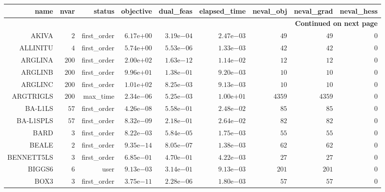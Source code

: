 \begin{longtable}{rrrrrrrrr}
\hline
name & nvar & status & objective & dual\_feas & elapsed\_time & neval\_obj & neval\_grad & neval\_hess \\\hline
\endhead
\hline
\multicolumn{9}{r}{{\bfseries Continued on next page}}\\
\hline
\endfoot
\endlastfoot
AKIVA & \(     2\) & first\_order & \( 6.17\)e\(+00\) & \( 3.19\)e\(-04\) & \( 2.47\)e\(-03\) & \(    49\) & \(    49\) & \(     0\) \\
ALLINITU & \(     4\) & first\_order & \( 5.74\)e\(+00\) & \( 5.53\)e\(-06\) & \( 1.33\)e\(-03\) & \(    42\) & \(    42\) & \(     0\) \\
ARGLINA & \(   200\) & first\_order & \( 2.00\)e\(+02\) & \( 1.63\)e\(-12\) & \( 1.14\)e\(-02\) & \(    12\) & \(    12\) & \(     0\) \\
ARGLINB & \(   200\) & first\_order & \( 9.96\)e\(+01\) & \( 1.38\)e\(-01\) & \( 9.20\)e\(-03\) & \(    10\) & \(    10\) & \(     0\) \\
ARGLINC & \(   200\) & first\_order & \( 1.01\)e\(+02\) & \( 8.25\)e\(-03\) & \( 9.13\)e\(-03\) & \(    10\) & \(    10\) & \(     0\) \\
ARGTRIGLS & \(   200\) & max\_time & \( 2.34\)e\(-06\) & \( 5.25\)e\(-03\) & \( 1.00\)e\(+01\) & \(  4359\) & \(  4359\) & \(     0\) \\
BA-L1LS & \(    57\) & first\_order & \( 4.26\)e\(-08\) & \( 5.58\)e\(-01\) & \( 2.48\)e\(-02\) & \(    85\) & \(    85\) & \(     0\) \\
BA-L1SPLS & \(    57\) & first\_order & \( 8.32\)e\(-09\) & \( 2.18\)e\(-01\) & \( 2.64\)e\(-02\) & \(    82\) & \(    82\) & \(     0\) \\
BARD & \(     3\) & first\_order & \( 8.22\)e\(-03\) & \( 5.84\)e\(-05\) & \( 1.75\)e\(-03\) & \(    55\) & \(    55\) & \(     0\) \\
BEALE & \(     2\) & first\_order & \( 9.35\)e\(-14\) & \( 8.05\)e\(-07\) & \( 1.38\)e\(-03\) & \(    62\) & \(    62\) & \(     0\) \\
BENNETT5LS & \(     3\) & first\_order & \( 6.85\)e\(-01\) & \( 4.70\)e\(-01\) & \( 4.22\)e\(-03\) & \(    27\) & \(    27\) & \(     0\) \\
BIGGS6 & \(     6\) & user & \( 9.13\)e\(-03\) & \( 3.14\)e\(-01\) & \( 9.13\)e\(-03\) & \(   201\) & \(   201\) & \(     0\) \\
BOX3 & \(     3\) & first\_order & \( 3.75\)e\(-11\) & \( 2.28\)e\(-06\) & \( 1.80\)e\(-03\) & \(    57\) & \(    57\) & \(     0\) \\

\end{longtable}
